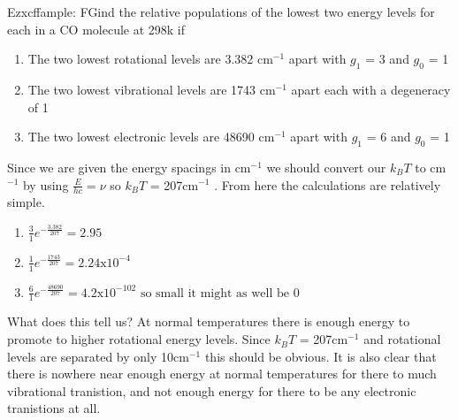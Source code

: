 \documentclass{article}
\newcommand{\cm}{cm\(^{-1}\) }
\begin{document}
    Ezxcffample: FGind the relative populations of the lowest two energy levels for each in a CO molecule at 298k if
    \begin{enumerate}
        \item The two lowest rotational levels are 3.382 cm$^{-1}$ apart with $g_1$ = 3 and $g_0$ = 1
        \item The two lowest vibrational levels are 1743 cm$^{-1}$ apart each with a degeneracy of 1
        \item The two lowest electronic levels are 48690 cm$^{-1}$ apart with $g_1$ = 6 and $g_0$ = 1
    \end{enumerate}

    Since we are given the energy spacings in cm\(^{-1}\) we should convert our $k_BT$ to cm$^{-1}$ by using
    \(\frac{E}{hc} = \nu\) so $k_BT$ = 207\cm. From here the calculations are relatively simple.
    \begin{enumerate}
        \item \(\frac{3}{1}e^{-\frac{3.382}{207}} = 2.95\)
        \item \(\frac{1}{1}e^{-\frac{1743}{207}} = 2.24\text{x}10^{-4}\)
        \item \(\frac{6}{1}e^{-\frac{48690}{207}} = 4.2\text{x}10^{-102} \text{ so small it might as well be 0}\)
    \end{enumerate}

    What does this tell us? At normal temperatures there is enough energy to promote to higher rotational 
    energy levels. Since $k_BT$ = 207\cm and rotational levels are separated by only 10\cm this should be obvious.
    It is also clear that there is nowhere near enough energy at normal temperatures for there to much vibrational
    tranistion, and not enough energy for there to be any electronic tranistions at all.
\end{document}
